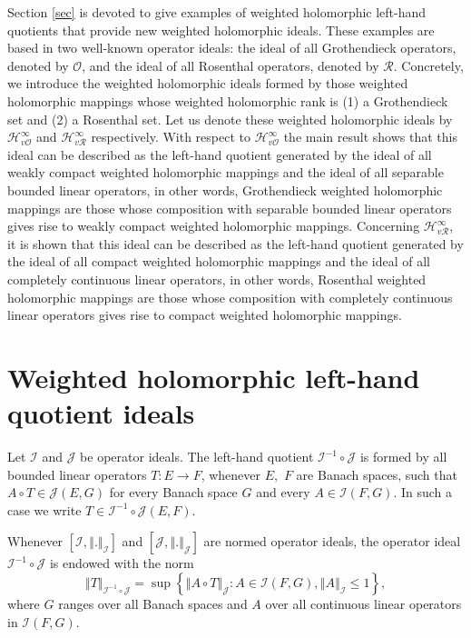 \documentclass[12pt]{amsart}
\theoremstyle{plain}
\numberwithin{equation}{section}
\begin{document}
Section \ref{sec} is devoted to give examples of weighted holomorphic left-hand quotients that provide new weighted holomorphic ideals. These examples are based in two well-known operator ideals: the ideal of all Grothendieck operators, denoted by $\mathcal O$, and the ideal of all  Rosenthal operators, denoted by $\mathcal R$. Concretely, we introduce the weighted holomorphic ideals formed by those weighted holomorphic mappings whose weighted holomorphic rank is (1) a Grothendieck set and (2) a Rosenthal set. Let us denote these weighted holomorphic ideals by    $\mathcal H_{v\mathcal O}^\infty $ and $\mathcal H_{v\mathcal R}^\infty $ respectively. With respect to $\mathcal H_{v\mathcal O}^\infty $ the main result shows that this ideal can be described as the left-hand quotient generated by the ideal of all weakly compact weighted holomorphic mappings and the ideal of all separable bounded linear operators, in other words, Grothendieck weighted holomorphic mappings are those whose composition with separable bounded linear operators gives rise to weakly compact weighted holomorphic mappings. Concerning $\mathcal H_{v\mathcal R}^\infty $, it is shown that this ideal can be described as the left-hand quotient generated by the ideal of all compact weighted holomorphic mappings  and the ideal of all completely continuous linear operators, in other words, Rosenthal weighted holomorphic mappings are those whose composition with completely continuous  linear operators gives rise to  compact weighted holomorphic mappings.

 
\section{Weighted holomorphic left-hand quotient ideals}\label{s1}


Let $\mathcal{I}$ and $\mathcal{J}$ be operator ideals. The left-hand quotient $\mathcal{I}
^{-1}\circ \mathcal{J}$ is  formed by all  bounded linear operators $%
T:E\rightarrow F$, whenever $E,$ $F$ are 
Banach spaces, such that  $A\circ T\in 
\mathcal{J}\left( E,G\right) $ for every Banach space $G$ and every $A\in \mathcal{I}\left( F,G\right)$. In such a case we write $T\in \mathcal{I}^{-1}\circ \mathcal{J}%
\left( E,F\right). $ 

Whenever $\left[ \mathcal{I},\left\Vert .\right\Vert _{\mathcal{I}}%
\right] $ and $\left[ \mathcal{J},\left\Vert .\right\Vert _{\mathcal{J}}%
\right] $ are normed operator ideals, the operator ideal $\mathcal{I}
^{-1}\circ \mathcal{J}$ is endowed with the norm
\begin{equation*}
\left\Vert T\right\Vert _{\mathcal{I}^{-1}\circ \mathcal{J}}=\sup \left\{
\left\Vert A\circ T\right\Vert _{\mathcal{J}}:A\in \mathcal{I}\left(
F,G\right) ,\left\Vert A\right\Vert _{\mathcal{I}}\leq 1\right\} ,
\end{equation*}%
where $G$ ranges over all Banach spaces and $A$ over all continuous linear operators in $ \mathcal{I}\left( F,G\right)$.
\end{document}
